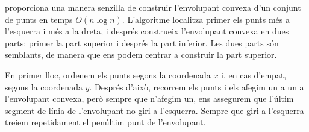 
 \cite{and79} proporciona una manera
senzilla de construir l'envolupant convexa d'un conjunt de punts en
temps $O(n \log n)$. L'algoritme localitza primer els punts més a
l'esquerra i més a la dreta, i després construeix l'envolupant convexa
en dues parts: primer la part superior i després la part inferior. Les
dues parts són semblants, de manera que ens podem centrar a construir
la part superior.

En primer lloc, ordenem els punts segons la coordenada $x$ i, en cas
d'empat, segons la coordenada $y$. Després d'això, recorrem els punts
i els afegim un a un a l'envolupant convexa, però sempre que n'afegim
un, ens assegurem que l'últim segment de línia de l'envolupant no giri
a l'esquerra. Sempre que giri a l'esquerra treiem repetidament el
penúltim punt de l'envolupant.

